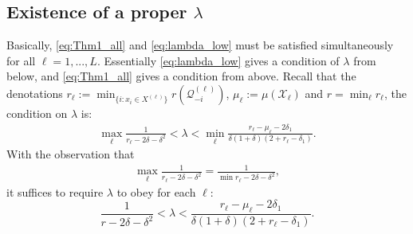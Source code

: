 \documentclass[twoside,11pt]{article}
\numberwithin{equation}{section}
\begin{document}
\subsection{Existence of a proper  \texorpdfstring{$\lambda$}{lambda}}\label{sec:exist_lambda}

Basically, \eqref{eq:Thm1_all} and \eqref{eq:lambda_low} must be satisfied simultaneously for all $\ell=1,...,L$. Essentially \eqref{eq:lambda_low} gives a condition of $\lambda$ from below, and \eqref{eq:Thm1_all} gives a condition from above. Recall that the denotations $r_{\ell}:=\min_{\{i: x_i\in X^{(\ell)}\}}r(\mathcal{Q}^{(\ell)}_{-i})$, $\mu_{\ell}:=\mu(\mathcal{X}_{\ell})$ and $r=\min_{\ell} r_{\ell}$, the condition on $\lambda$ is:
\begin{align*}
  \max_{\ell}\frac{1}{r_{\ell} - 2\delta-\delta^2}<\lambda < \min_{\ell}\frac{r_{\ell}-\mu_{\ell}-2\delta_1}{\delta(1+\delta)(2+r_{\ell}-\delta_1)}.
\end{align*}
With the observation that
\begin{align*}
\max_{\ell}\frac{1}{r_{\ell} - 2\delta-\delta^2}
= \frac{1}{\min r_{\ell} - 2\delta-\delta^2},
\end{align*}
it suffices to require $\lambda$ to obey for each $\ell$:
\begin{equation}\label{eq:lambda_range}
\frac{1}{r - 2\delta-\delta^2}<
        \lambda<\frac{r_{\ell}-\mu_{\ell}-2\delta_1}{\delta(1+\delta)(2+r_{\ell}-\delta_1)}.
\end{equation}




\end{document}
